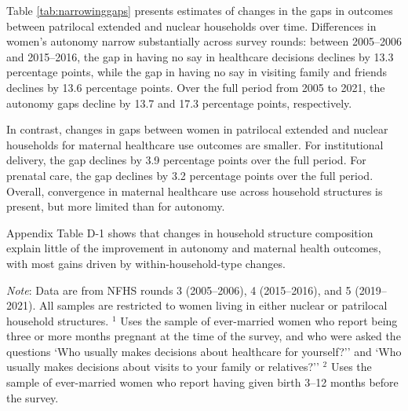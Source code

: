 \documentclass[12pt]{article}
\begin{document}
Table \ref{tab:narrowinggaps} presents estimates of changes in the gaps in outcomes between patrilocal extended and nuclear households over time.  Differences in women’s autonomy narrow substantially across survey rounds: between 2005–2006 and 2015–2016, the gap in having no say in healthcare decisions declines by 13.3 percentage points, while the gap in having no say in visiting family and friends declines by 13.6 percentage points. Over the full period from 2005 to 2021, the autonomy gaps decline by 13.7 and 17.3 percentage points, respectively.

In contrast, changes in gaps between women in patrilocal extended and nuclear households for maternal healthcare use outcomes are smaller. For institutional delivery, the gap declines by 3.9 percentage points over the full period. For prenatal care, the gap declines by 3.2 percentage points over the full period. Overall, convergence in maternal healthcare use across household structures is present, but more limited than for autonomy. 

Appendix Table D-1 shows that changes in household structure composition explain little of the improvement in autonomy and maternal health outcomes, with most gains driven by within-household-type changes. 

\begin{table}[H]
\sffamily
\caption{: The gap between patrilocal extended and nuclear households in women's autonomy and healthcare use is narrowing over time}
\label{tab:narrowinggaps}
\vspace{-4pt}

\begin{scriptsize}
\setlength{\tabcolsep}{6pt}
\renewcommand{\arraystretch}{1.6}

\makebox[\linewidth][c]{%
%
}

\end{scriptsize}

\vspace{1ex}
\small\scriptsize{\textsf{\textit{Note}: Data are from NFHS rounds 3 (2005--2006), 4 (2015--2016), and 5 (2019--2021).}}
\newline
\small\scriptsize{\textsf{All samples are restricted to women living in either nuclear or patrilocal household structures.}}
\newline
\small\scriptsize{\textsf{$^1$ Uses the sample of ever-married women who report being three or more months pregnant at the time of the survey, and who were asked the questions `Who usually makes decisions about healthcare for yourself?'' and `Who usually makes decisions about visits to your family or relatives?''}}
\newline
\small\scriptsize{\textsf{$^2$ Uses the sample of ever-married women who report having given birth 3--12 months before the survey.}}
\end{table}
\end{document}
